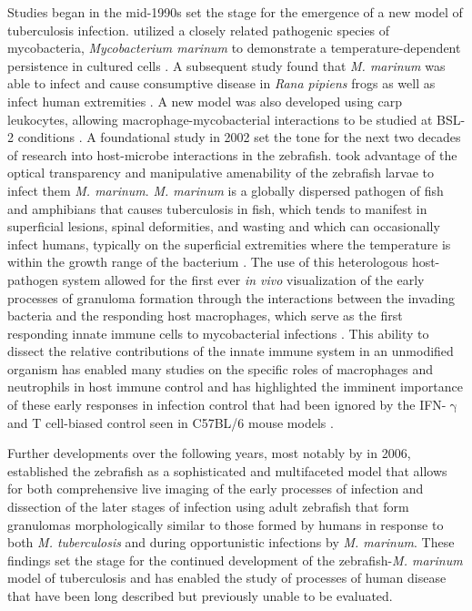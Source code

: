 Studies began in the mid-1990s set the stage for the emergence of a new model of tuberculosis infection. \citeauthor{Ramakrishnan1994} utilized a closely related pathogenic species of mycobacteria, \textit{Mycobacterium marinum} to demonstrate a temperature-dependent persistence in cultured cells \citep{Tobin2008}. A subsequent study found that \textit{M. marinum} was able to infect and cause consumptive disease in \textit{Rana pipiens} frogs as well as infect human extremities \citep{Ramakrishnan1997a, Ramakrishnan1997b, Cosma2006}. A new model was also developed using carp leukocytes, allowing macrophage-mycobacterial interactions to be studied at BSL-2 conditions \citep{ElEtr2001}. A foundational study in 2002 set the tone for the next two decades of research into host-microbe interactions in the zebrafish. \citeauthor{Davis2002} took advantage of the optical transparency and manipulative amenability of the zebrafish larvae to infect them \textit{M. marinum}. \textit{M. marinum} is a globally dispersed pathogen of fish and amphibians that causes tuberculosis in fish, which tends to manifest in superficial lesions, spinal deformities, and wasting and which can occasionally infect humans, typically on the superficial extremities where the temperature is within the growth range of the bacterium \citep{Hashish2018, Aronson1926, Gray1990, Parisot1958}. The use of this heterologous host-pathogen system allowed for the first ever \textit{in vivo} visualization of the early processes of granuloma formation through the interactions between the invading bacteria and the responding host macrophages, which serve as the first responding innate immune cells to mycobacterial infections \citep{Davis2002, Davis2009}. This ability to dissect the relative contributions of the innate immune system in an unmodified organism has enabled many studies on the specific roles of macrophages and neutrophils in host immune control and has highlighted the imminent importance of these early responses in infection control that had been ignored by the IFN-$\upgamma$ and T cell-biased control seen in C57BL/6 mouse models \citep{Lesley2008}.

Further developments over the following years, most notably by \citeauthor{Swaim2006} in 2006, established the zebrafish as a sophisticated and multifaceted model that allows for both comprehensive live imaging of the early processes of infection and dissection of the later stages of infection using adult zebrafish that form granulomas morphologically similar to those formed by humans in response to both \textit{M. tuberculosis} and during opportunistic infections by \textit{M. marinum}. These findings set the stage for the continued development of the zebrafish-\textit{M. marinum} model of tuberculosis and has enabled the study of processes of human disease that have been long described but previously unable to be evaluated.

